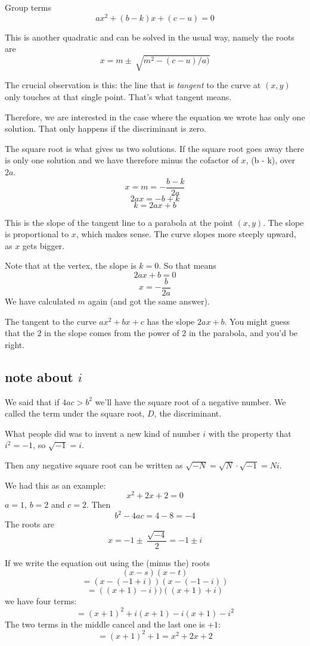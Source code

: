 \documentclass[11pt, oneside]{article}
\begin{document}
Group terms
\[ ax^2 + (b - k)x + (c - u) = 0 \]

This is another quadratic and can be solved in the usual way, namely the roots are
\[ x = m \pm \ \sqrt{m^2 - (c-u)/a)} \]

The crucial observation is this:  the line that is \emph{tangent} to the curve at $(x,y)$ only touches at that single point.  That's what tangent means.

Therefore, we are interested in the case where the equation we wrote has only one solution.  That only happens if the discriminant is zero.

The square root is what gives us two solutions.  If the square root goes away there is only one solution and we have therefore minus the cofactor of $x$, (b - k), over $2a$.
\[ x = m = -\frac{b - k}{2a} \]
\[ 2ax = - b + k \]
\[ k = 2ax + b \]

This is the slope of the tangent line to a parabola at the point $(x,y)$.  The slope is proportional to $x$, which makes sense.  The curve slopes more steeply upward, as $x$ gets bigger.

Note that at the vertex, the slope is $k = 0$.  So that means
\[ 2ax + b = 0 \]
\[ x = - \frac{b}{2a} \]
We have calculated $m$ again (and got the same answer).

The tangent to the curve $ax^2 + bx + c$ has the slope $2ax + b$.  You might guess that the $2$ in the slope comes from the power of $2$ in the parabola, and you'd be right.

\subsection*{note about $i$}
We said that if $4ac > b^2$ we'll have the square root of a negative number.  We called the term under the square root, $D$, the discriminant.

What people did was to invent a new kind of number $i$ with the property that $i^2 = -1$, so $\sqrt{-1} = i$.

Then any negative square root can be written as $\sqrt{-N} = \sqrt{N} \cdot \sqrt{-1} = Ni$.

We had this as an example:  
\[ x^2 + 2x + 2 = 0 \]
$a = 1$, $b = 2$ and $c = 2$.  Then
\[ b^2 - 4ac = 4 - 8 = -4 \]
The roots are
\[ x = -1 \pm \ \frac{\sqrt{-4}}{2} = -1 \pm i \]

If we write the equation out using the (minus the) roots
\[ (x - s)(x - t) \]
\[ = (x - (- 1 + i))(x - (-1 - i)) \]
\[ = ((x + 1) - i))((x + 1) + i) \]
we have four terms:
\[ = (x + 1)^2 + i (x+1) - i (x+1) - i^2 \]
The two terms in the middle cancel and the last one is $+1$:
\[ = (x + 1)^2 + 1 = x^2 + 2x + 2 \]
\end{document}

